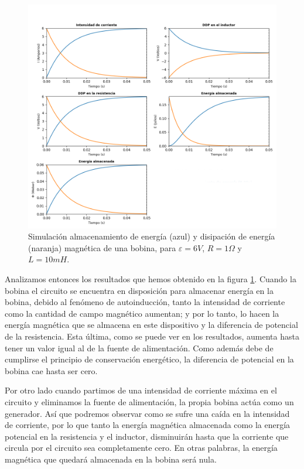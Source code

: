 \documentclass[../main.tex]{subfiles}
\begin{document}
\begin{figure}[!h]
    \centering
    \includegraphics[width=\textwidth]{images/resultados_ejemplo_circuitoRL.png}
    \caption{Simulación almacenamiento de energía (azul) y disipación de energía (naranja) magnética de una bobina, para $\varepsilon=6V$, $R=1 \Omega$ y $L=10 mH$.}
    \label{fig::sim_ejemplo_rl}
\end{figure}


Analizamos entonces los resultados que hemos obtenido en la figura \ref{fig::sim_ejemplo_rl}. Cuando la bobina el circuito se encuentra en disposición para almacenar energía en la bobina, debido al fenómeno de autoinducción, tanto la intensidad de corriente como la cantidad de campo magnético aumentan; y por lo tanto, lo hacen la energía magnética que se almacena en este dispositivo y la diferencia de potencial de la resistencia. Esta última, como se puede ver en los resultados, aumenta hasta tener un valor igual al de la fuente de alimentación. Como además debe de cumplirse el principio de conservación energético, la diferencia de potencial en la bobina cae hasta ser cero. 

Por otro lado cuando partimos de una intensidad de corriente máxima en el circuito y eliminamos la fuente de alimentación, la propia bobina actúa como un generador. Así que podremos observar como se sufre una caída en la intensidad de corriente, por lo que tanto la energía magnética almacenada como la energía potencial en la resistencia y el inductor, disminuirán hasta que la corriente que circula por el circuito sea completamente cero. En otras palabras, la energía magnética que quedará almacenada en la bobina será nula.
\end{document}
